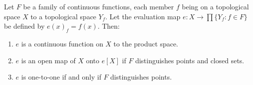 Let $F$ be a family of continuous functions, each member $f$ being on a topological space $X$ to a topological space $Y_f$. Let the evaluation map $e : X \to \prod \{Y_f : f \in F\}$ be defined by $e(x)_f = f(x)$. Then:
\begin{enumerate}
\item[(a)] $e$ is a continuous function on $X$ to the product space.
\item[(b)] $e$ is an open map of $X$ onto $e[X]$ if $F$ distinguishes points and closed sets.
\item[(c)] $e$ is one-to-one if and only if $F$ distinguishes points.
\end{enumerate}
